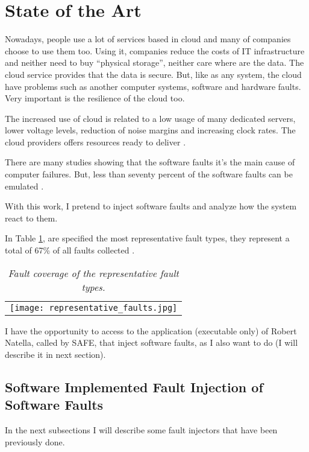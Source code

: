 \newpage
\section{State of the Art}

Nowadays, people use a lot of services based in cloud and many of companies choose to use them too. Using it, companies reduce the costs of IT infrastructure and neither need to buy ``physical storage'', neither care where are the data. The cloud service provides that the data is secure.
But, like as any system, the cloud have problems such as another computer systems, software and hardware faults. Very important is the resilience of the cloud too.

The increased use of cloud is related to a low usage of many dedicated servers, lower voltage levels, reduction of noise margins and increasing clock rates. The cloud providers offers resources ready to deliver \cite{wolter2012resilience}.

There are many studies showing that the software faults\cite{avizzienisbasic} it's the main cause of computer failures. But, less than seventy percent of the software faults can be emulated \cite{madeira2000emulation}.

With this work, I pretend to inject software faults and analyze how the system react to them.

In Table \ref{tab:representative_faults}, are specified the most representative fault types, they represent a total of 67\% of all faults collected \cite{duraes2005thesis}.

\begin{table}[!ht]
\begin{tabular}{c}
\texttt{[image: representative\_faults.jpg]}
\end{tabular}
\caption{\small \sl Fault coverage of the representative fault types. \cite{duraes2005thesis} \label{tab:representative_faults}}
\end{table}





I have the opportunity to access to the application (executable only)
of Robert Natella, called by SAFE, that inject software faults, as I also want to do (I will describe it in next section).

\clearpage
\subsection{Software Implemented Fault Injection of Software Faults}
In the next subsections I will describe some fault injectors that have been previously done.\\

